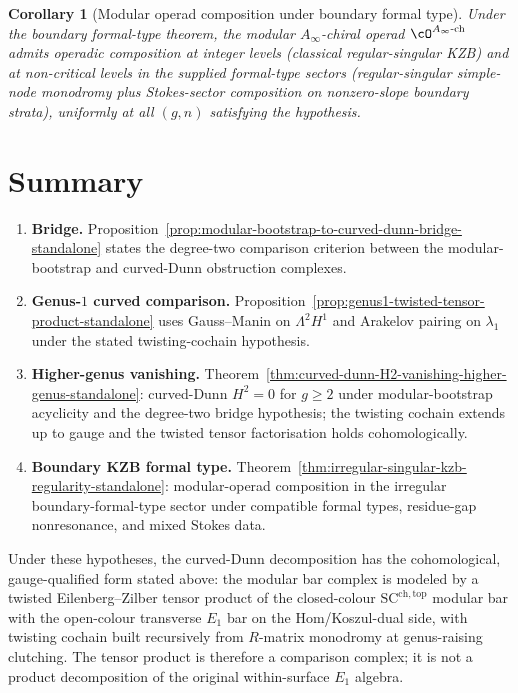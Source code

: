 \documentclass[11pt]{amsart}
\newtheorem{corollary}[theorem]{Corollary}
\theoremstyle{definition}
\theoremstyle{remark}
\providecommand{\Ainf}{A_\infty}
\begin{document}
\begin{corollary}[Modular operad composition under boundary formal type]%
\label{cor:modular-operad-composition-all-levels-standalone}%
Under the boundary formal-type theorem, the modular
$\Ainf$-chiral operad $\cO^{\Ainf\text{-ch}}$ admits
operadic composition at integer levels (classical regular-singular
KZB) and at non-critical levels in the supplied formal-type sectors
(regular-singular simple-node monodromy plus Stokes-sector
composition on nonzero-slope boundary strata), uniformly at all
$(g,n)$ satisfying the hypothesis.
\end{corollary}

\section{Summary}
\label{sec:cd-summary-standalone}

\begin{enumerate}[label=\textup{(\arabic*)}]
\item \textbf{Bridge.}
  Proposition~\ref{prop:modular-bootstrap-to-curved-dunn-bridge-standalone}
  states the degree-two comparison criterion between the
  modular-bootstrap and curved-Dunn obstruction complexes.
\item \textbf{Genus-$1$ curved comparison.}
  Proposition~\ref{prop:genus1-twisted-tensor-product-standalone} uses
  Gauss--Manin on $\Lambda^2 H^1$ and Arakelov pairing on
  $\lambda_1$ under the stated twisting-cochain hypothesis.
\item \textbf{Higher-genus vanishing.}
  Theorem~\ref{thm:curved-dunn-H2-vanishing-higher-genus-standalone}: curved-Dunn
  $H^2 = 0$ for $g \ge 2$ under modular-bootstrap acyclicity and the
  degree-two bridge hypothesis; the twisting cochain extends up to
  gauge and the twisted tensor factorisation holds cohomologically.
\item \textbf{Boundary KZB formal type.}
  Theorem~\ref{thm:irregular-singular-kzb-regularity-standalone}: modular-operad
  composition in the irregular boundary-formal-type sector under
  compatible formal types, residue-gap nonresonance, and mixed Stokes
  data.
\end{enumerate}

Under these hypotheses, the curved-Dunn decomposition has the
cohomological, gauge-qualified form stated above: the modular bar
complex is modeled by a twisted Eilenberg--Zilber tensor product of
the closed-colour $\mathrm{SC}^{\mathrm{ch,top}}$ modular bar with
the open-colour transverse $E_1$ bar on the Hom/Koszul-dual side,
with twisting cochain built recursively from $R$-matrix monodromy at
genus-raising clutching. The tensor product is therefore a comparison
complex; it is not a product decomposition of the original
within-surface $E_1$ algebra.
\end{document}

